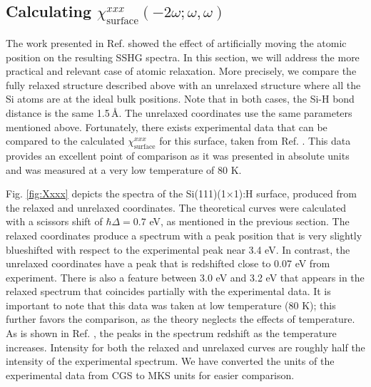 
\subsection{Calculating 
\texorpdfstring{$\chi^{xxx}_{\mathrm{surface}}(-2\omega;\omega,\omega)$}{Xxxx}}
\label{sec:res1x1chi}

The work presented in Ref. \cite{mejiaPRB02} showed the effect of artificially
moving the atomic position on the resulting SSHG spectra. In this section, we
will address the more practical and relevant case of atomic relaxation. More
precisely, we compare the fully relaxed structure described above with an
unrelaxed structure where all the Si atoms are at the ideal bulk positions. Note
that in both cases, the Si-H bond distance is the same 1.5\,\AA. The unrelaxed
coordinates use the same parameters mentioned above. Fortunately, there exists
experimental data that can be compared to the calculated
$\chi^{xxx}_{\mathrm{surface}}$ for this surface, taken from Ref.
\cite{hoferAPA96}. This data provides an excellent point of comparison as it was
presented in absolute units and was measured at a very low temperature of 80 K.

Fig. \ref{fig:Xxxx} depicts the spectra of the Si(111)(1$\times$1):H surface,
produced from the relaxed and unrelaxed coordinates. The theoretical curves were
calculated with a scissors shift of $\hbar\Delta = 0.7$ eV, as mentioned in the
previous section. The relaxed coordinates produce a spectrum with a peak
position that is very slightly blueshifted with respect to the experimental peak
near 3.4 eV. In contrast, the unrelaxed coordinates have a peak that is
redshifted close to 0.07 eV from experiment. There is also a feature between 3.0
eV and 3.2 eV that appears in the relaxed spectrum that coincides partially with
the experimental data. It is important to note that this data was taken at low
temperature (80 K); this further favors the comparison, as the theory neglects
the effects of temperature. As is shown in Ref. \cite{hoferAPA96}, the peaks in
the spectrum redshift as the temperature increases. Intensity for both the
relaxed and unrelaxed curves are roughly half the intensity of the experimental
spectrum. We have converted the units of the experimental data from CGS to MKS
units for easier comparison.

